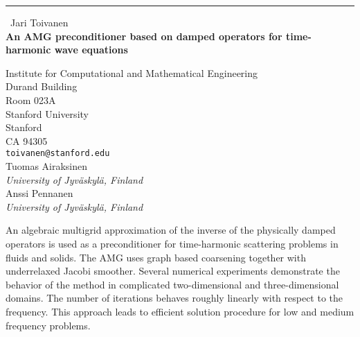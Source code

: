 \documentclass{report}
\begin{document}
\begin{center}
\rule{6in}{1pt} \
{\large Jari Toivanen \\
{\bf An AMG preconditioner based on damped operators for time-harmonic wave equations}}

Institute for Computational and Mathematical Engineering \\ Durand Building \\ Room 023A \\ Stanford University \\ Stanford \\ CA 94305
\\
{\tt toivanen@stanford.edu}\\
Tuomas Airaksinen\\
{\em University of Jyv\"askyl\"a, Finland}\\
Anssi Pennanen\\
{\em University of Jyv\"askyl\"a, Finland}\end{center}

An algebraic multigrid approximation of the inverse of the physically
damped operators is used as a preconditioner for time-harmonic scattering
problems in fluids and solids. The AMG uses graph based coarsening
together with underrelaxed Jacobi smoother. Several numerical experiments
demonstrate the behavior of the method in complicated two-dimensional and
three-dimensional domains. The number of iterations behaves roughly
linearly with respect to the frequency. This approach leads to efficient
solution procedure for low and medium frequency problems.
\end{document}
